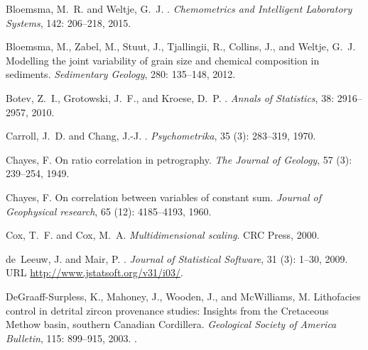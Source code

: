 \documentclass[11pt]{article}
\begin{document}
\begin{thebibliography}{68}
Bloemsma, M.~R. and Weltje, G.~J.
.
\newblock \emph{Chemometrics and Intelligent Laboratory Systems}, 142:
  206--218, 2015.

Bloemsma, M., Zabel, M., Stuut, J., Tjallingii, R., Collins, J., and Weltje,
  G.~J.
\newblock Modelling the joint variability of grain size and chemical
  composition in sediments.
\newblock \emph{Sedimentary Geology}, 280: 135--148, 2012.

{Botev}, Z.~I., {Grotowski}, J.~F., and {Kroese}, D.~P.
.
\newblock \emph{Annals of Statistics}, 38: 2916--2957, 2010.

Carroll, J.~D. and Chang, J.-J.
.
\newblock \emph{Psychometrika}, 35 (3): 283--319, 1970.

Chayes, F.
\newblock On ratio correlation in petrography.
\newblock \emph{The Journal of Geology}, 57 (3): 239--254,
  1949.

Chayes, F.
\newblock On correlation between variables of constant sum.
\newblock \emph{Journal of Geophysical research}, 65 (12):
  4185--4193, 1960.

Cox, T.~F. and Cox, M.~A.
\newblock \emph{Multidimensional scaling}.
\newblock CRC Press, 2000.

de~Leeuw, J. and Mair, P.
.
\newblock \emph{Journal of Statistical Software}, 31 (3):
  1--30, 2009.
\newblock URL \url{http://www.jstatsoft.org/v31/i03/}.

DeGraaff-Surpless, K., Mahoney, J., Wooden, J., and McWilliams, M.
\newblock Lithofacies control in detrital zircon provenance studies: {I}nsights
  from the {C}retaceous {M}ethow basin, southern {C}anadian {C}ordillera.
\newblock \emph{Geological Society of America Bulletin}, 115:
  899--915, 2003.
\newblock {}.


\end{thebibliography}
\end{document}
